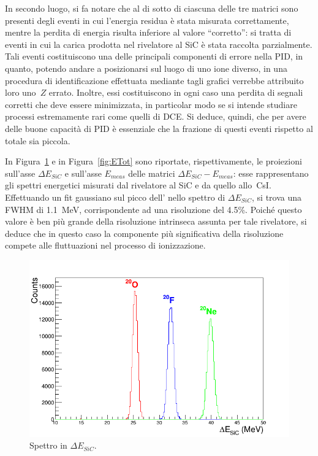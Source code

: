 In secondo luogo, si fa notare che al di sotto di ciascuna delle tre matrici sono presenti degli eventi in cui l'energia residua è stata misurata correttamente, mentre la perdita di energia risulta inferiore al valore ``corretto'': si tratta di eventi in cui la carica prodotta nel rivelatore al SiC è stata raccolta parzialmente. 
Tali eventi costituiscono una delle principali componenti di errore nella PID, in quanto, potendo andare a posizionarsi sul luogo di uno ione diverso, in una procedura di identificazione effettuata mediante tagli grafici verrebbe attribuito loro uno~$Z$ errato.
Inoltre, essi costituiscono in ogni caso una perdita di segnali corretti che deve essere minimizzata, in particolar modo se si intende studiare processi estremamente rari come quelli di DCE.
Si deduce, quindi, che per avere delle buone capacità di PID è essenziale che la frazione di questi eventi rispetto al totale sia piccola.











In Figura~\ref{fig:deltaE_Tot} e in Figura~\ref{fig:ETot} sono riportate, rispettivamente, le proiezioni sull'asse $\Delta E_{SiC}$ e sull'asse $E_{meas}$ delle matrici $\Delta E_{SiC} - E_{meas}$: esse rappresentano gli spettri energetici misurati dal rivelatore al SiC e da quello allo~CsI.
Effettuando un fit gaussiano sul picco dell' nello spettro di $\Delta E_{SiC}$, si trova una FWHM di 1.1~MeV, corrispondente ad una risoluzione del 4.5\%.
Poiché questo valore è ben più grande della risoluzione intrinseca assunta per tale rivelatore, si deduce che in questo caso la componente più significativa della risoluzione compete alle fluttuazioni nel processo di ionizzazione.

\begin{figure} [!p]
	\centering
	\includegraphics[scale=0.5]{Grafici_Tesi2/Particelle_monocromatiche/deltaE.png}
	\caption{Spettro in $ \Delta E_{SiC} $.} \label{fig:deltaE_Tot}
\end{figure}


